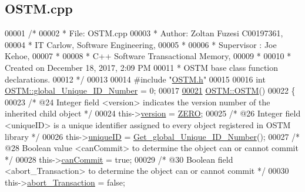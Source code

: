 \hypertarget{_o_s_t_m_8cpp_source}{}\subsection{O\+S\+T\+M.\+cpp}

\begin{DoxyCode}
00001 \textcolor{comment}{/* }
00002 \textcolor{comment}{ * File:   OSTM.cpp}
00003 \textcolor{comment}{ * Author: Zoltan Fuzesi C00197361, }
00004 \textcolor{comment}{ * IT Carlow, Software Engineering, }
00005 \textcolor{comment}{ *}
00006 \textcolor{comment}{ * Supervisor : Joe Kehoe, }
00007 \textcolor{comment}{ *}
00008 \textcolor{comment}{ * C++ Software Transactional Memory, }
00009 \textcolor{comment}{ * }
00010 \textcolor{comment}{ * Created on December 18, 2017, 2:09 PM}
00011 \textcolor{comment}{ * OSTM base class function declarations.}
00012 \textcolor{comment}{ */}
00013 
00014 \textcolor{preprocessor}{#include "\hyperlink{_o_s_t_m_8h}{OSTM.h}"}
00015 
00016 \textcolor{keywordtype}{int} \hyperlink{class_o_s_t_m_acb617b9666d198c0de333c8613df0d4b_acb617b9666d198c0de333c8613df0d4b}{OSTM::global\_Unique\_ID\_Number} = 0;
00017 
\hypertarget{_o_s_t_m_8cpp_source.tex_l00021}{}\hyperlink{class_o_s_t_m_a968edf778668bd0ec7603f0571619196_a968edf778668bd0ec7603f0571619196}{00021} \hyperlink{class_o_s_t_m_a968edf778668bd0ec7603f0571619196_a968edf778668bd0ec7603f0571619196}{OSTM::OSTM}()
00022 \{
00023     \textcolor{comment}{/* @24 Integer field <version> indicates the version number of the inherited child object */}
00024     this->\hyperlink{class_o_s_t_m_a9a6ea36181be2db7f9082d77956511d7_a9a6ea36181be2db7f9082d77956511d7}{version} = \hyperlink{class_o_s_t_m_a0bb6ae8411d25f8e7b82d0a61729ea89_a0bb6ae8411d25f8e7b82d0a61729ea89}{ZERO};
00025     \textcolor{comment}{/* @26 Integer field <uniqueID> is a unique identifier assigned to every object registered in OSTM
       library */}
00026     this->\hyperlink{class_o_s_t_m_aa9fe59368b701af7f70befa23bd6901a_aa9fe59368b701af7f70befa23bd6901a}{uniqueID} = \hyperlink{class_o_s_t_m_adee6903c1100e0d78640bd4b85e5d7df_adee6903c1100e0d78640bd4b85e5d7df}{Get\_global\_Unique\_ID\_Number}();
00027     \textcolor{comment}{/* @28 Boolean value <canCommit> to determine the object can or cannot commit */}
00028     this->\hyperlink{class_o_s_t_m_a2a5b89641af274ddc69bdf8c1c1a07d6_a2a5b89641af274ddc69bdf8c1c1a07d6}{canCommit} = \textcolor{keyword}{true};
00029     \textcolor{comment}{/* @30 Boolean field <abort\_Transaction> to determine the object can or cannot commit */}
00030     this->\hyperlink{class_o_s_t_m_a5121d9c4b08320b26beca82ba2f85c4a_a5121d9c4b08320b26beca82ba2f85c4a}{abort\_Transaction} = \textcolor{keyword}{false};

\end{DoxyCode}
